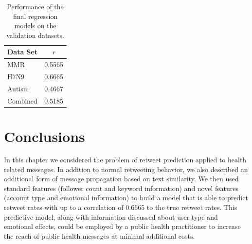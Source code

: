 \begin{table}[]
\centering
\begin{tabular}{l|r}
\multicolumn{1}{c|}{Data Set} & \multicolumn{1}{c}{\(r\)} \\ \hline
MMR                           & 0.5565                 \\
H7N9                          & 0.6665                 \\
Autism                        & 0.4667                 \\
Combined                      & 0.5185                
\end{tabular}
\caption{Performance of the final regression models on the validation datasets.}
\label{tab:retweetfinal}
\end{table}

\section{Conclusions}

In this chapter we considered the problem of retweet prediction applied to health related messages. In addition to normal retweeting behavior, we also described an additional form of message propagation based on text similarity. We then used standard features (follower count and keyword information) and novel features (account type and emotional information) to build a model that is able to predict retweet rates with up to a correlation of 0.6665 to the true retweet rates. This predictive model, along with information discussed about user type and emotional effects, could be employed by a public health practitioner to increase the reach of public health messages at minimal additional costs. 

%
%
%
%
